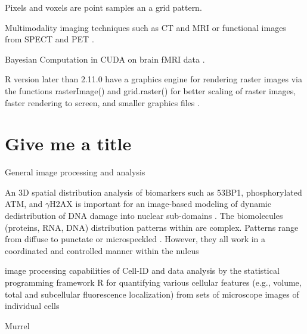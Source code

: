 Pixels and voxels are point samples an a grid pattern.


Multimodality imaging techniques such as CT and MRI or functional images from SPECT and PET \cite{marti-bonmati_multimodality_2010}.

Bayesian Computation in CUDA on brain fMRI data \citep{da_silva_cudabayesreg_2010}.


R version later than 2.11.0 have a graphics engine for rendering raster images via the functions rasterImage() and grid.raster() for better  scaling  of  raster  images,  faster
rendering to screen,  and smaller graphics files \cite{murrell_raster_2011}.

\section{Give me a title}

General image processing and analysis \citep{ljosa_introduction_2009}

An 3D spatial distribution analysis of biomarkers such as 53BP1, phosphorylated 
ATM, and $\gamma$H2AX  is important for an image-based modeling of dynamic 
dedistribution of DNA damage into nuclear sub-domains 
\citep{costes_image-based_2007}. The biomolecules (proteins, RNA, DNA) distribution patterns within are complex. 
Patterns range from diffuse to punctate or microspeckled 
\citep{shiels_quantitative_2007, willitzki_new_2012}. However, they all work in a coordinated and controlled 
manner within the nuleus \citep{shiels_quantitative_2007}

image processing capabilities of Cell-ID and data analysis by the statistical 
programming framework R for quantifying various cellular features (e.g., volume, 
total and subcellular fluorescence localization) from sets of microscope 
images of individual cells \citep{bush_using_2012}

\citep{tabelow_modeling_2012, tabelow_dti:_2014}

Murrel \citep{murrell_raster_2011}
 \citep{clayden_mmand:_2016}

